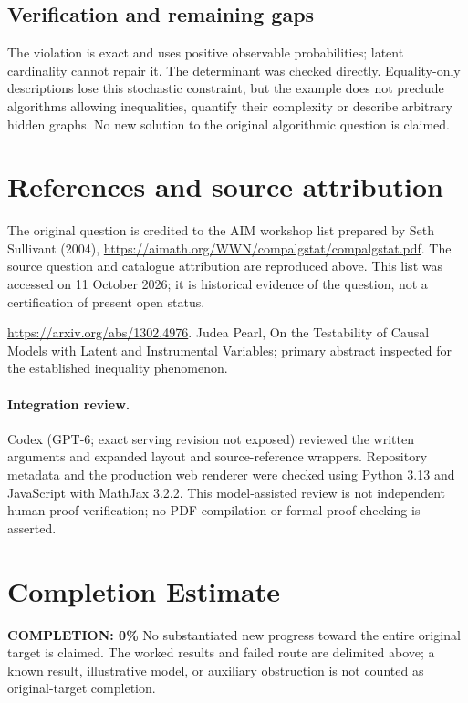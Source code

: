 \documentclass[11pt]{article}
\begin{document}
\subsection{Verification and remaining gaps}
The violation is exact and uses positive observable probabilities; latent cardinality cannot repair it. The determinant was checked directly. Equality-only descriptions lose this stochastic constraint, but the example does not preclude algorithms allowing inequalities, quantify their complexity or describe arbitrary hidden graphs. No new solution to the original algorithmic question is claimed.

\section{References and source attribution}
The original question is credited to the AIM workshop list prepared by Seth Sullivant (2004), \url{https://aimath.org/WWN/compalgstat/compalgstat.pdf}. The source question and catalogue attribution are reproduced above. This list was accessed on 11 October 2026; it is historical evidence of the question, not a certification of present open status.

\url{https://arxiv.org/abs/1302.4976}. Judea Pearl, On the Testability of Causal Models with Latent and Instrumental Variables; primary abstract inspected for the established inequality phenomenon.


\paragraph{Integration review.} Codex (GPT-6; exact serving revision not exposed) reviewed the written arguments and expanded layout and source-reference wrappers. Repository metadata and the production web renderer were checked using Python 3.13 and JavaScript with MathJax 3.2.2. This model-assisted review is not independent human proof verification; no PDF compilation or formal proof checking is asserted.

\section{Completion Estimate}
\noindent\textbf{COMPLETION: 0\%}
No substantiated new progress toward the entire original target is claimed. The worked results and failed route are delimited above; a known result, illustrative model, or auxiliary obstruction is not counted as original-target completion.
\end{document}
